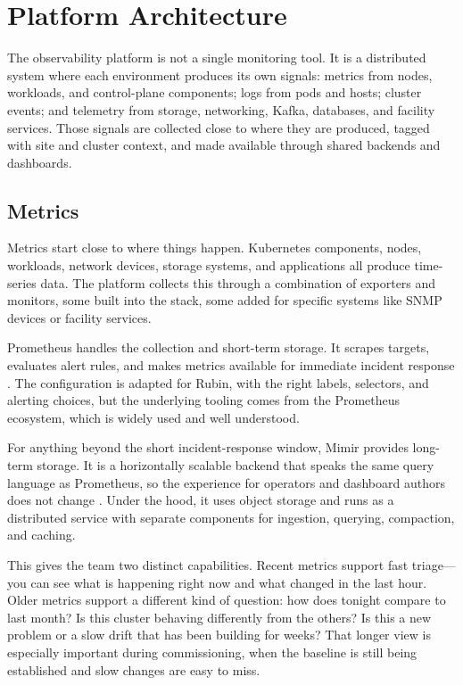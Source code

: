 \section{Platform Architecture}

The observability platform is not a single monitoring tool. It is a distributed system where each
environment produces its own signals: metrics from nodes, workloads, and control-plane components;
logs from pods and hosts; cluster events; and telemetry from storage, networking, Kafka, databases,
and facility services. Those signals are collected close to where they are produced, tagged with
site and cluster context, and made available through shared backends and dashboards.

\subsection{Metrics}

Metrics start close to where things happen. Kubernetes components, nodes, workloads, network
devices, storage systems, and applications all produce time-series data. The platform collects this
through a combination of exporters and monitors, some built into the stack, some added for specific
systems like SNMP devices or facility services.

Prometheus handles the collection and short-term storage. It scrapes targets, evaluates alert
rules, and makes metrics available for immediate incident response
\cite{lsst-it-k8s-cookbook,prometheus-operator,prometheus-alerting}. The configuration is adapted
for Rubin, with the right labels, selectors, and alerting choices, but the underlying tooling comes
from the Prometheus ecosystem, which is widely used and well understood.

For anything beyond the short incident-response window, Mimir provides long-term storage. It is a
horizontally scalable backend that speaks the same query language as Prometheus, so the experience
for operators and dashboard authors does not change \cite{grafana-mimir}. Under the hood, it uses
object storage and runs as a distributed service with separate components for ingestion, querying,
compaction, and caching.

This gives the team two distinct capabilities. Recent metrics support fast triage---you can see
what is happening right now and what changed in the last hour. Older metrics support a different
kind of question: how does tonight compare to last month? Is this cluster behaving differently from
the others? Is this a new problem or a slow drift that has been building for weeks? That longer
view is especially important during commissioning, when the baseline is still being established and
slow changes are easy to miss.


